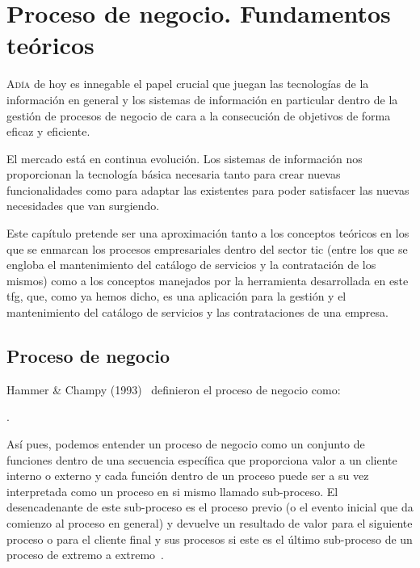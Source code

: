 \chapter{Proceso de negocio. Fundamentos teóricos}
\label{chap:teoria}

\lettrine{A} {día} de hoy es innegable el papel crucial que juegan las tecnologías de la información en general y los sistemas de información en particular dentro de la gestión de procesos de negocio de cara a la consecución de objetivos de forma eficaz y eficiente. 

El mercado está en continua evolución. Los sistemas de información nos proporcionan la tecnología básica necesaria tanto para crear nuevas funcionalidades como para adaptar las existentes para poder satisfacer las nuevas necesidades que van surgiendo. 


Este capítulo pretende ser una aproximación tanto a los conceptos teóricos en los que se enmarcan los procesos empresariales dentro del sector \acrfull{tic} (entre los que se engloba el mantenimiento del catálogo de servicios y la contratación de los mismos) como a los conceptos manejados por la herramienta desarrollada en este \acrshort{tfg}, que, como ya hemos dicho, es una aplicación para la gestión y el mantenimiento del catálogo de servicios y las contrataciones de una empresa.


\section{Proceso de negocio}

Hammer \& Champy (1993)~\cite{Hammer-Champy} definieron el proceso de negocio como:

\begin{displayquote}
. 
\end{displayquote}

Así pues, podemos entender un proceso de negocio como un conjunto de funciones dentro de una secuencia específica que proporciona valor a un cliente interno o externo y cada función dentro de un proceso puede ser a su vez interpretada como un proceso en si mismo llamado sub-proceso. El desencadenante de este sub-proceso es el proceso previo (o el evento inicial que da comienzo al proceso en general) y devuelve un resultado de valor para el siguiente proceso o para el cliente final y sus procesos si este es el último sub-proceso de un proceso de extremo a extremo~\cite{Kirchmer}. 

